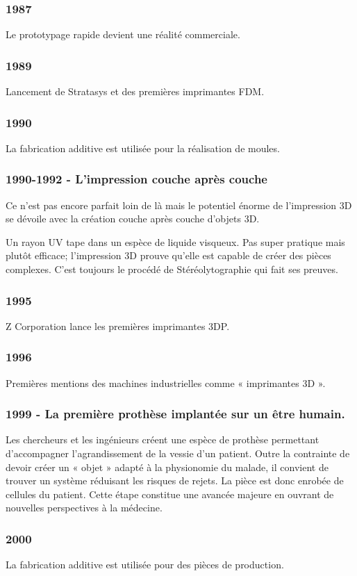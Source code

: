 \documentclass{article}
\begin{document}
\subsubsection{1987}
Le prototypage rapide devient une réalité commerciale.
\subsubsection{1989}
Lancement de Stratasys et des premières imprimantes FDM.
\subsubsection{1990}
La fabrication additive est utilisée pour la réalisation de moules.
\subsubsection{1990-1992 - L'impression couche après couche}
Ce n'est pas encore parfait loin de là mais le potentiel énorme de l'impression 3D se dévoile avec la création couche après couche d'objets 3D.

Un rayon UV tape dans un espèce de liquide visqueux. Pas super pratique mais plutôt efficace; l'impression 3D prouve qu'elle est capable de créer des pièces complexes. C'est toujours le procédé de Stéréolytographie qui fait ses preuves.
\subsubsection{1995}
Z Corporation lance les premières imprimantes 3DP.
\subsubsection{1996}
Premières mentions des machines industrielles comme « imprimantes 3D ».
\subsubsection{1999 - La première prothèse implantée sur un être humain.}
Les chercheurs et les ingénieurs créent une espèce de prothèse permettant d'accompagner l'agrandissement de la vessie d'un patient. Outre la contrainte de devoir créer un « objet » adapté à la physionomie du malade, il convient de trouver un système réduisant les risques de rejets. La pièce est donc enrobée de cellules du patient. Cette étape constitue une avancée majeure en ouvrant de nouvelles perspectives à la médecine.
\subsubsection{2000}
La fabrication additive est utilisée pour des pièces de production.
\end{document}
